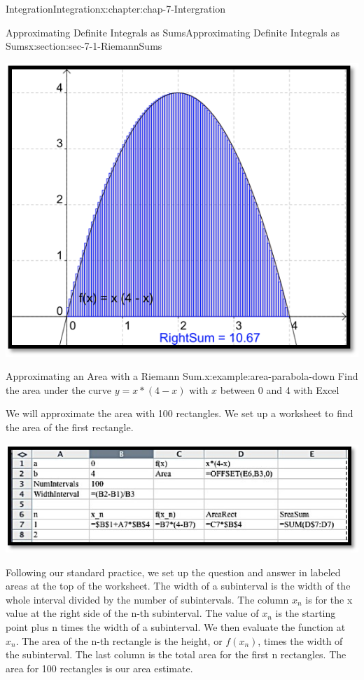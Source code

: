 \documentclass[oneside,10pt,]{book}
\numberwithin{equation}{section}
\begin{document}
\begin{chapterptx}{Integration}{}{Integration}{}{}{x:chapter:chap-7-Intergration}
\begin{sectionptx}{Approximating Definite Integrals as Sums}{}{Approximating Definite Integrals as Sums}{}{}{x:section:sec-7-1-RiemannSums}
\begin{sidebyside}{1}{0.2}{0.2}{0}
\begin{sbspanel}{0.6}
\includegraphics[width=\linewidth]{images/sec7-1-8.png}
\end{sbspanel}%
\end{sidebyside}%
\begin{example}{Approximating an Area with a Riemann Sum.}{x:example:area-parabola-down}%
Find the area under the curve \(y=x*(4-x)\) with \(x\) between 0 and 4 with Excel%
\par
We will approximate the area with 100 rectangles.  We set up a worksheet to find the area of the first rectangle.%
\begin{sidebyside}{1}{0.15}{0.15}{0}%
\begin{sbspanel}{0.7}%
\includegraphics[width=\linewidth]{images/sec7-1-9.png}
\end{sbspanel}%
\end{sidebyside}%
\par
Following our standard practice, we set up the question and answer in labeled areas at the top of the worksheet.  The width of a subinterval is the width of the whole interval divided by the number of subintervals.  The column \(x_n\) is for the x value at the right side of the n-th subinterval.   The value of \(x_n\) is the starting point plus n times the width of a subinterval.  We then evaluate the function at \(x_n\).  The area of the n-th rectangle is the height, or \(f(x_n)\), times the width of the subinterval.  The last column is the total area for the first n rectangles.  The area for 100 rectangles is our area estimate.%

\end{example}
\end{sectionptx}
\end{chapterptx}
\end{document}
